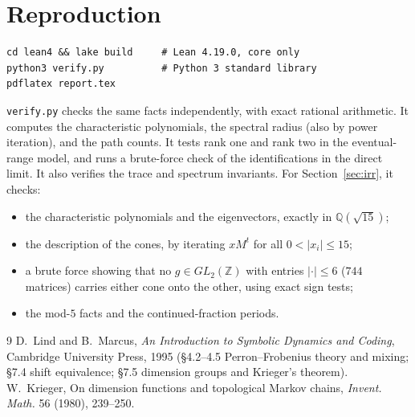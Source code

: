 \documentclass[11pt]{article}
\theoremstyle{definition}
\theoremstyle{remark}
\newcommand{\Z}{\mathbb{Z}}
\newcommand{\Q}{\mathbb{Q}}
\begin{document}
\section{Reproduction}
\begin{verbatim}
cd lean4 && lake build     # Lean 4.19.0, core only
python3 verify.py          # Python 3 standard library
pdflatex report.tex
\end{verbatim}
\texttt{verify.py} checks the same facts independently, with exact rational
arithmetic. It computes the characteristic polynomials, the spectral radius (also by
power iteration), and the path counts. It tests rank one and rank two in the
eventual-range model, and runs a brute-force check of the identifications in the
direct limit. It also verifies the trace and spectrum invariants. For
Section~\ref{sec:irr}, it checks:
\begin{itemize}
\item the characteristic polynomials and the eigenvectors, exactly in $\Q(\sqrt{15})$;
\item the description of the cones, by iterating $xM^t$ for all $0<|x_i|\le15$;
\item a brute force showing that no $g\in GL_2(\Z)$ with entries $|\cdot|\le6$
($744$ matrices) carries either cone onto the other, using exact sign tests;
\item the mod-$5$ facts and the continued-fraction periods.
\end{itemize}

\begin{thebibliography}{9}
 D.~Lind and B.~Marcus, \emph{An Introduction to Symbolic Dynamics and
Coding}, Cambridge University Press, 1995 (\S4.2--4.5 Perron--Frobenius theory and
mixing; \S7.4 shift equivalence; \S7.5 dimension groups and Krieger's theorem).
 W.~Krieger, On dimension functions and topological Markov chains,
\emph{Invent. Math.} 56 (1980), 239--250.
\end{thebibliography}
\end{document}
